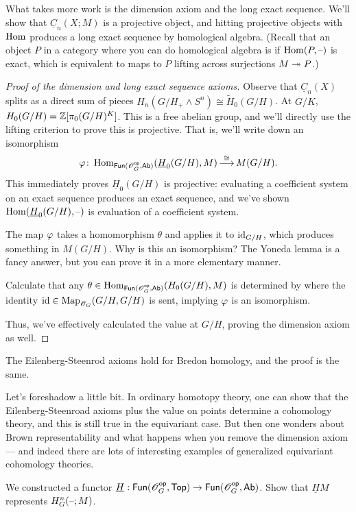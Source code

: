 What takes more work is the dimension axiom and the long exact sequence. We'll show that $\underline C_n(X;M)$ is a
projective object, and hitting projective objects with $\operatorname{Hom}$ produces a long exact sequence by homological
algebra. (Recall that an object $P$ in a category where you can do homological algebra is  if
$\operatorname{Hom}(P,\text{--})$ is exact, which is equivalent to maps to $P$ lifting across surjections $M\twoheadrightarrow P$.)
\begin{proof}[Proof of the dimension and long exact sequence axioms]
Observe that $\underline C_n(X)$ splits as a direct sum of pieces $H_n(G/H_+\wedge S^n)\cong \widetilde H_0(G/H)$.
At $G/K$, $H_0(G/H) = \mathbb Z[\pi_0(G/H)^K]$. This is a free abelian group, and we'll directly use the lifting criterion
to prove this is projective. That is, we'll write down an isomorphism
\[\varphi\colon\operatorname{Hom}_{\mathsf{Fun}(\mathscr O_G^{\mathsf{op}}, \mathsf{Ab})}(\underline H_0(G/H), M) \mathop{\longrightarrow}\limits^{\cong} M(G/H).\]
This immediately proves $\underline H_0(G/H)$ is projective: evaluating a coefficient system on an exact sequence
produces an exact sequence, and we've shown $\operatorname{Hom}(\underline H_0(G/H), \text{--})$ is evaluation of a coefficient system.

The map $\varphi$ takes a homomorphism $\theta$ and applies it to $\mathrm{id}_{G/H}$, which produces something in $M(G/H)$.
Why is this an isomorphism? The Yoneda lemma is a fancy answer, but you can prove it in a more elementary manner.
\begin{ex}
Calculate that any $\theta\in\operatorname{Hom}_{\mathsf{Fun}(\mathscr O_G^{\mathsf{op}}, \mathsf{Ab})}(H_0(G/H), M)$ is determined by where the identity
$\mathrm{id}\in\operatorname{Map}_{\mathscr O_G}(G/H, G/H)$ is sent, implying $\varphi$ is an isomorphism.
\end{ex}
Thus, we've effectively calculated the value at $G/H$, proving the dimension axiom as well.
\end{proof}
The Eilenberg-Steenrod axioms hold for Bredon homology, and the proof is the same.
\begin{rem}
Let's foreshadow a little bit. In ordinary homotopy theory, one can show that the Eilenberg-Steenroad axioms
plus the value on points determine a cohomology theory, and this is still true in the equivariant case. But then
one wonders about Brown representability and what happens when you remove the dimension axiom --- and indeed
there are lots of interesting examples of generalized equivariant cohomology theories.
\end{rem}
\begin{ex}
We constructed a functor $\underline H:\mathsf{Fun}(\mathscr O_G^{\mathsf{op}},\mathsf{Top})\to \mathsf{Fun}(\mathscr O_G^{\mathsf{op}}, \mathsf{Ab})$. Show that $\underline HM$
represents $H_G^n(\text{--}; M)$.
\end{ex}
